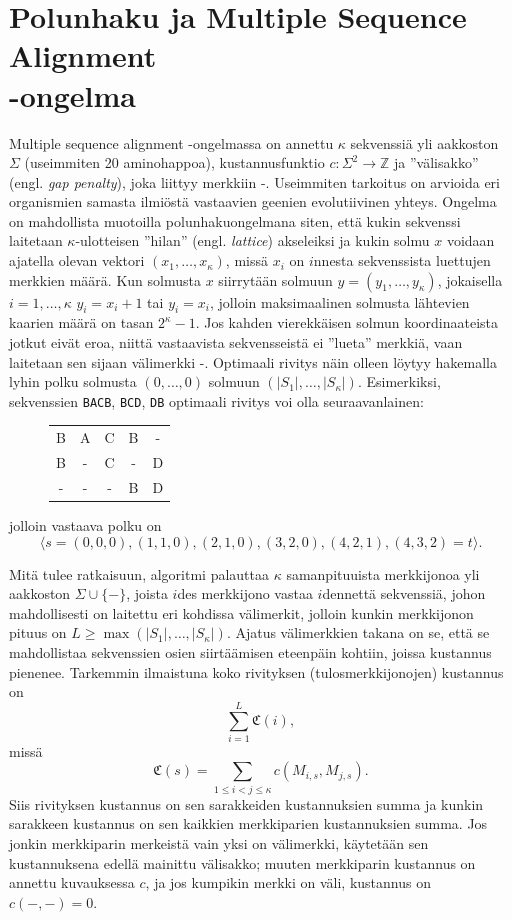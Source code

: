 \documentclass[finnish]{tktltiki2}
\theoremstyle{definition}
\theoremstyle{remark}
\begin{document}
\section{Polunhaku ja Multiple Sequence Alignment \\-ongelma}
Multiple sequence alignment -ongelmassa on annettu $\kappa$ sekvenssiä yli aakkoston $\Sigma$ (useimmiten 20 aminohappoa), kustannusfunktio $c \colon \Sigma^2 \to \mathbb{Z}$ ja ''välisakko'' (engl. \textit{gap penalty}), joka liittyy merkkiin -. Useimmiten tarkoitus on arvioida eri organismien samasta ilmiöstä vastaavien geenien evolutiivinen yhteys.  Ongelma on mahdollista muotoilla polunhakuongelmana siten, että kukin sekvenssi laitetaan $\kappa$-ulotteisen ''hilan'' (engl. \textit{lattice}) akseleiksi ja kukin solmu $x$ voidaan ajatella olevan vektori $(x_1, \dots, x_\kappa)$, missä $x_i$ on $i$nnesta sekvenssista luettujen merkkien määrä. Kun solmusta $x$ siirrytään solmuun $y = (y_1, \dots, y_\kappa)$, jokaisella $i = 1, \dots, \kappa$ $y_i = x_i + 1$ tai $y_i = x_i$, jolloin maksimaalinen solmusta lähtevien kaarien määrä on tasan $2^\kappa - 1$. Jos kahden vierekkäisen solmun koordinaateista jotkut eivät eroa, niittä vastaavista sekvensseistä ei ''lueta'' merkkiä, vaan laitetaan sen sijaan välimerkki -. Optimaali rivitys näin olleen löytyy hakemalla lyhin polku solmusta $(0, \dots, 0)$ solmuun $(|S_1|, \dots, |S_\kappa|)$. Esimerkiksi, sekvenssien \texttt{BACB}, \texttt{BCD}, \texttt{DB} optimaali rivitys voi olla seuraavanlainen:
\begin{figure}[H]
\centering
\begin{tabular}{ccccc}
B & A & C & B & - \\
B & - & C & - & D \\
- & - & - & B & D
\end{tabular}
\end{figure}
jolloin vastaava polku on
\[ 
\langle s = (0, 0, 0), (1, 1, 0), (2, 1, 0), (3, 2, 0), (4, 2, 1), (4, 3, 2) = t \rangle.
\]

Mitä tulee ratkaisuun, algoritmi palauttaa $\kappa$ samanpituuista merkkijonoa yli aakkoston $\Sigma \cup \{ - \}$, joista $i$des merkkijono vastaa $i$dennettä sekvenssiä, johon mahdollisesti on laitettu eri kohdissa välimerkit, jolloin kunkin merkkijonon pituus on $L \geq \max(|S_1|, \dots, |S_\kappa|)$. Ajatus välimerkkien takana on se, että se mahdollistaa sekvenssien osien siirtäämisen eteenpäin kohtiin, joissa kustannus pienenee. Tarkemmin ilmaistuna koko rivityksen (tulosmerkkijonojen) kustannus on
\[
\sum_{i = 1}^L \mathfrak{C}(i),
\]
missä 
\[
\mathfrak{C}(s) = \sum_{1 \leq i < j \leq \kappa} c(M_{i, s}, M_{j, s}).
\]
Siis rivityksen kustannus on sen sarakkeiden kustannuksien summa ja kunkin sarakkeen kustannus on sen kaikkien merkkiparien kustannuksien summa. Jos jonkin merkkiparin merkeistä vain yksi on välimerkki, käytetään sen kustannuksena edellä mainittu välisakko; muuten merkkiparin kustannus on annettu kuvauksessa $c$, ja jos kumpikin merkki on väli, kustannus on $c(-,-) = 0$.
 
\end{document}
